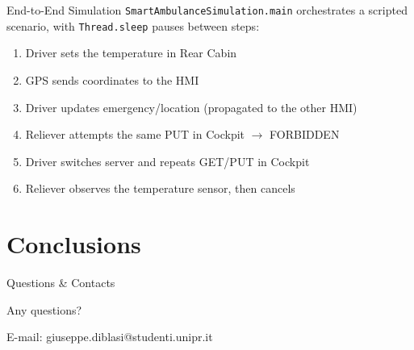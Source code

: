 \documentclass[aspectratio=169]{beamer}
\begin{document}
\begin{frame}{End-to-End Simulation}
\texttt{SmartAmbulanceSimulation.main} orchestrates a scripted scenario, with \texttt{Thread.sleep} pauses between steps:
\begin{enumerate}
\item Driver sets the temperature in Rear Cabin
\item GPS sends coordinates to the HMI
\item Driver updates emergency/location (propagated to the other HMI)
\item Reliever attempts the same PUT in Cockpit $\rightarrow$ FORBIDDEN
\item Driver switches server and repeats GET/PUT in Cockpit
\item Reliever observes the temperature sensor, then cancels
\end{enumerate}
\end{frame}

\section{Conclusions}


\begin{frame}{Questions \& Contacts}
  \vfill
  \begin{center}
    {\Huge Any questions?}

    \vspace{1.5cm}
    {\small E-mail: giuseppe.diblasi@studenti.unipr.it}
  \end{center}
  \vfill
\end{frame}
\end{document}
